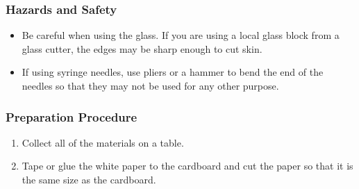 \subsubsection*{Hazards and Safety}
\begin{itemize}
\item{Be careful when using the glass.  If you are using a local glass block from a glass cutter, the edges may be sharp enough to cut skin.}
\item{If using syringe needles, use pliers or a hammer to bend the end of the needles so that they may not be used for any other purpose.}
\end{itemize}

\subsubsection*{Preparation Procedure}
\begin{enumerate}
\item{Collect all of the materials on a table.} 
\item{Tape or glue the white paper to the cardboard and cut the paper so that it is the same size as the cardboard.} 
\end{enumerate}


